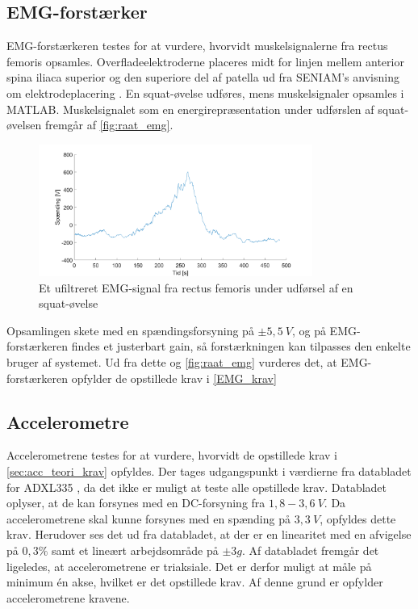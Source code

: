 \subsection{EMG-forstærker}

EMG-forstærkeren testes for at vurdere, hvorvidt muskelsignalerne fra rectus femoris opsamles. Overfladeelektroderne placeres midt for linjen mellem anterior spina iliaca superior og den superiore del af patella ud fra SENIAM's anvisning om elektrodeplacering \citep{seniam2016}. En squat-øvelse udføres, mens muskelsignaler opsamles i MATLAB. Muskelsignalet som en energirepræsentation under udførslen af squat-øvelsen fremgår af \autoref{fig:raat_emg}. 

\begin{figure}[H]
\centering
\includegraphics[width=0.8\textwidth]{figures/raat_EMG_test}
\caption{Et ufiltreret EMG-signal fra rectus femoris under udførsel af en squat-øvelse}
\label{fig:raat_emg}
\end{figure}

\noindent
Opsamlingen skete med en spændingsforsyning på $\pm5,5~V$, og på EMG-forstærkeren findes et justerbart gain, så forstærkningen kan tilpasses den enkelte bruger af systemet. Ud fra dette og \autoref{fig:raat_emg} vurderes det, at EMG-forstærkeren opfylder de opstillede krav i \autoref{EMG_krav}

\subsection{Accelerometre}

Accelerometrene testes for at vurdere, hvorvidt de opstillede krav i \autoref{sec:acc_teori_krav} opfyldes. Der tages udgangspunkt i værdierne fra databladet for ADXL335 \citep{analogdevices2010}, da det ikke er muligt at teste alle opstillede krav. Databladet oplyser, at de kan forsynes med en DC-forsyning fra $1,8-3,6~V$. Da accelerometrene skal kunne forsynes med en spænding på $3,3~V$, opfyldes dette krav. Herudover ses det ud fra databladet, at der er en linearitet med en afvigelse på $0,3\%$ samt et lineært arbejdsområde på $ \pm 3 g$. Af databladet fremgår det ligeledes, at accelerometrene er triaksiale. Det er derfor muligt at måle på minimum én akse, hvilket er det opstillede krav. Af denne grund er opfylder accelerometrene kravene.  

